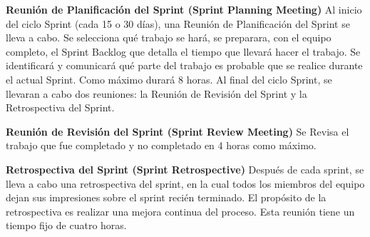 \textbf{Reunión de Planificación del Sprint (Sprint Planning Meeting)}
Al inicio del ciclo Sprint (cada 15 o 30 días), una Reunión de Planificación del Sprint se lleva a cabo.
Se selecciona qué trabajo se hará, 
se preparara, con el equipo completo, el Sprint Backlog que detalla el tiempo que llevará hacer el trabajo.
Se identificará y comunicará qué parte del trabajo es probable que se realice durante el actual Sprint.
Como máximo durará 8 horas.
Al final del ciclo Sprint, se llevaran a cabo dos reuniones: la Reunión de Revisión del Sprint y la Retrospectiva del Sprint.

\textbf{Reunión de Revisión del Sprint (Sprint Review Meeting)}
Se Revisa el trabajo que fue completado y no completado en 4 horas como máximo.

\textbf{Retrospectiva del Sprint (Sprint Retrospective)}
Después de cada sprint, se lleva a cabo una retrospectiva del sprint, en la cual todos los miembros del equipo dejan sus impresiones sobre el sprint recién terminado. El propósito de la retrospectiva es realizar una mejora continua del proceso. Esta reunión tiene un tiempo fijo de cuatro horas.